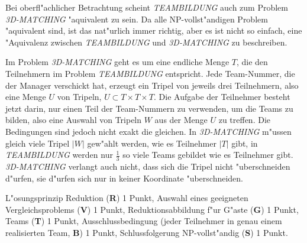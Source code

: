 \begin{diskussion}
Bei oberfl"achlicher Betrachtung scheint \textsl{TEAMBILDUNG} auch
zum Problem \textsl{3D-MATCHING} "aquivalent zu sein. Da alle NP-vollst"andigen
Problem "aquivalent sind, ist das nat"urlich immer richtig, aber
es ist nicht so einfach, eine "Aquivalenz zwischen 
\textsl{TEAMBILDUNG} und 
\textsl{3D-MATCHING} zu beschreiben.

Im Problem \textsl{3D-MATCHING} geht es um eine endliche Menge $T$,
die den Teilnehmern im Problem \textsl{TEAMBILDUNG} entspricht.
Jede Team-Nummer, die der Manager verschickt hat, erzeugt ein Tripel
von jeweils drei Teilnehmern, also eine Menge $U$ von Tripeln,
$U\subset T\times T\times T$. Die Aufgabe der Teilnehmer besteht
jetzt darin, nur einen Teil der Team-Nummern zu verwenden, um
die Teams zu bilden, also eine Auswahl von Tripeln $W$ aus der Menge $U$
zu treffen. Die Bedingungen sind jedoch nicht exakt die gleichen.
In \textsl{3D-MATCHING} m"ussen gleich viele Tripel $|W|$
gew"ahlt werden, wie es Teilnehmer $|T|$ gibt, in 
\textsl{TEAMBILDUNG} werden nur $\frac13$ so viele Teams gebildet
wie es Teilnehmer gibt. \textsl{3D-MATCHING} verlangt auch nicht,
dass sich die Tripel nicht "uberschneiden d"urfen, sie d"urfen sich
nur in keiner Koordinate "uberschneiden.
\end{diskussion}

\begin{bewertung}
L"osungsprinzip Reduktion ({\bf R}) 1 Punkt,
Auswahl eines geeigneten Vergleichsproblems ({\bf V}) 1 Punkt,
Reduktionsabbildung f"ur G"aste ({\bf G}) 1 Punkt,
Teams ({\bf T}) 1 Punkt,
Ausschlussbedingung (jeder Teilnehmer in genau einem realisierten Team,
{\bf B}) 1 Punkt,
Schlussfolgerung NP-vollst"andig ({\bf S}) 1 Punkt.
\end{bewertung}
